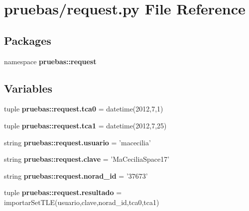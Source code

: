 \section{pruebas/request.py \-File \-Reference}
\label{request_8py}
\subsection*{\-Packages}
\begin{DoxyCompactItemize}
\item 
namespace {\bf pruebas\-::request}
\end{DoxyCompactItemize}
\subsection*{\-Variables}
\begin{DoxyCompactItemize}
\item 
tuple {\bf pruebas\-::request.\-tca0} = datetime(2012,7,1)
\item 
tuple {\bf pruebas\-::request.\-tca1} = datetime(2012,7,25)
\item 
string {\bf pruebas\-::request.\-usuario} = 'macecilia'
\item 
string {\bf pruebas\-::request.\-clave} = '\-Ma\-Cecilia\-Space17'
\item 
string {\bf pruebas\-::request.\-norad\-\_\-id} = '37673'
\item 
tuple {\bf pruebas\-::request.\-resultado} = importar\-Set\-T\-L\-E(usuario,clave,norad\-\_\-id,tca0,tca1)
\end{DoxyCompactItemize}
